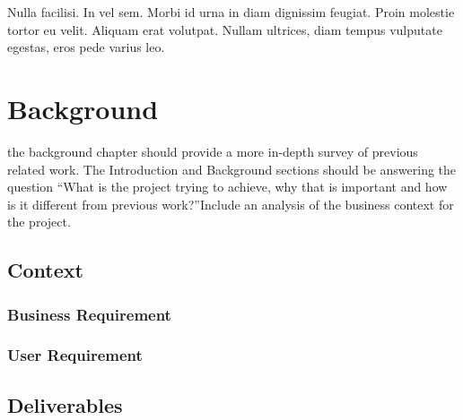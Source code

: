 \begin{savequote}[75mm]
Nulla facilisi. In vel sem. Morbi id urna in diam dignissim feugiat. Proin molestie tortor eu velit. Aliquam erat volutpat. Nullam ultrices, diam tempus vulputate egestas, eros pede varius leo.
\end{savequote}

\chapter{Background}

 the background chapter should provide a more in-depth survey of previous
related work.
The Introduction and Background sections should be answering the question
“What is the project trying to achieve, why that is important and how is it
different from previous work?”Include an analysis of the business context for
the project.


\section{Context}
\subsection{Business Requirement}
\subsection{User Requirement}

\section{Deliverables}
